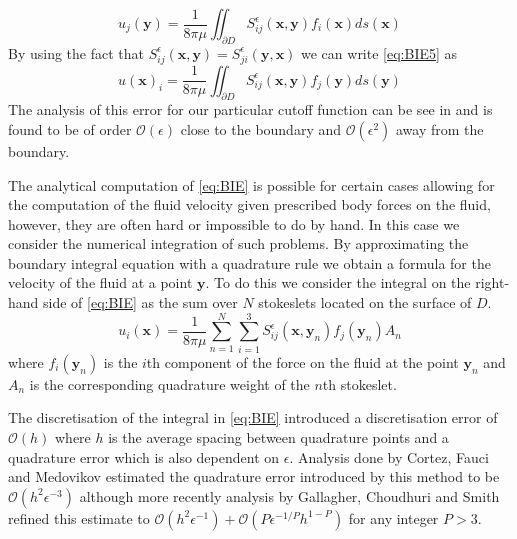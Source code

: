 \begin{equation}
    u_j(\bm{y}) = \frac{1}{8 \pi \mu} \iint_{\partial D} S_{i j}^{\epsilon}\left(\bm{x}, \bm{y}\right) f_{i}(\bm{x}) d s(\bm{x})
\end{equation}
By using the fact that $S_{i j}^{\epsilon}\left(\bm{x}, \bm{y}\right) = S_{j i}^{\epsilon}\left(\bm{y}, \bm{x}\right)$ we can write \cref{eq:BIE5} as 
\begin{equation}
  \label{eq:BIE}
    u(\bm{x})_i=\frac{1}{8 \pi \mu} \iint_{\partial D} S_{i j}^{\epsilon}\left(\bm{x}, \bm{y}\right) f_{j}(\bm{y}) d s(\bm{y})
\end{equation}
The analysis of this error for our particular cutoff function can be see in \cite{Cortez2005} and is found to be of order $\mathcal{O}(\epsilon)$ close to the boundary and $\mathcal{O}(\epsilon^2)$ away from the boundary.

The analytical computation of \cref{eq:BIE} is possible for certain cases allowing for the computation of the fluid velocity given prescribed body forces on the fluid, however, they are often hard or impossible to do by hand. In this case we consider the numerical integration of such problems. By approximating the boundary integral equation with a quadrature rule we obtain a formula for the velocity of the fluid at a point $\bm{y}$. To do this we consider the integral on the right-hand side of \cref{eq:BIE} as the sum over $N$ stokeslets located on the surface of $D$. 
\begin{equation}
\label{eq:Stokesletsum}
    u_{i}\left(\bm{x}\right)=\frac{1}{8 \pi \mu} \sum_{n=1}^{N} \sum_{i=1}^{3} S_{i j}^{\epsilon}\left(\bm{x}, {\bm{y}}_{n}\right) {f}_{j}({\bm{y}}_{n}) A_{n}
\end{equation}
where ${f}_{i}({\bm{y}}_n)$ is the $i$th component of the force on the fluid at the point ${\bm{y}}_n$ and $A_n$ is the corresponding quadrature weight of the $n$th stokeslet.

The discretisation of the integral in \cref{eq:BIE} introduced a discretisation error of $\mathcal{O}(h)$ where $h$ is the average spacing between quadrature points and a quadrature error which is also dependent on $\epsilon$. Analysis done by Cortez, Fauci and Medovikov \cite{Cortez2005} estimated the quadrature error introduced by this method to be $\mathcal{O}(h^2\epsilon^{-3})$ although more recently analysis by Gallagher, Choudhuri and Smith \cite{Gallagher2019SharpEquation} refined this estimate to $\mathcal{O}(h^2\epsilon^{-1}) + \mathcal{O}(P\epsilon^{-1/P} h^{1-P})$ for any integer $P>3$.

